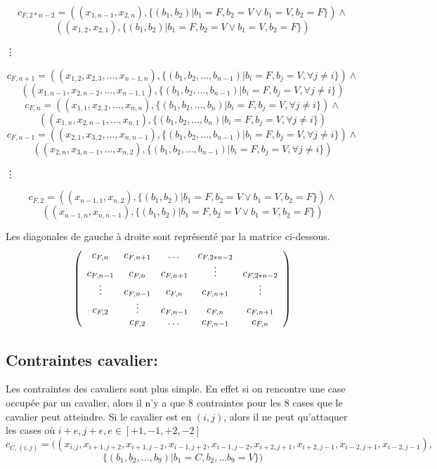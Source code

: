 \documentclass[a4paper,10pt]{article}
\begin{document}
$$ c_{F,2*n-2} = ((x_{1,n-1}, x_{2,n}), \{(b_1, b_2)| b_1 = F, b_2 = V \lor b_1 = V, b_2 = F\})\land$$ $$((x_{1,2}, x_{2,1}), \{(b_1, b_2)| b_1 = F, b_2 = V \lor b_1 = V, b_2 = F\}) $$ 
{\centering
  \vdots\par
}
$$ c_{F,n+1} = ((x_{1,2}, x_{2,3}, \ldots, x_{n-1,n}), \{(b_1, b_2, \ldots, b_{n-1})|b_i = F, b_j = V, \forall j \ne i\}) \land$$ $$((x_{1,n-1},x_{2,n-2}, \ldots, x_{n-1,1}), \{(b_1, b_2, \ldots, b_{n-1})|b_i = F, b_j = V, \forall j \ne i\}) $$
$$ c_{F,n} = ((x_{1,1}, x_{2,2},\ldots, x_{n,n}), \{(b_1, b_2, \ldots, b_n)|b_i = F, b_j = V, \forall j \ne i\}) \land$$ $$((x_{1,n}, x_{2,n-1}, \ldots, x_{n, 1}), \{(b_1, b_2, \ldots, b_n)|b_i = F, b_j = V, \forall j \ne i\})$$
$$ c_{F,n-1} = ((x_{2,1}, x_{3,2},\ldots, x_{n, n-1}), \{(b_1, b_2, \ldots, b_{n-1})|b_i = F, b_j = V, \forall j \ne i\}) \land$$ $$((x_{2,n}, x_{3,n-1}, \ldots, x_{n,2}), \{(b_1, b_2, \ldots, b_{n-1})|b_i = F, b_j = V, \forall j \ne i\}) $$
{\centering
  \vdots\par
}
$$ c_{F,2} = ((x_{n-1,1}, x_{n,2}), \{(b_1, b_2)| b_1 = F, b_2 = V \lor b_1 = V, b_2 = F\}) \land$$ $$((x_{n-1,n}, x_{n,n-1}), \{(b_1, b_2)|b_1 = F, b_2 = V \lor b_1 = V, b_2 = F\}) $$

	Les diagonales de gauche à droite sont représenté par la matrice ci-dessous.
\begin{equation}
\left( \begin{array}{ccccc}
c_{F,n} & c_{F,n+1} & \dots & c_{F,2*n-2} & \hfill \\
c_{F,n-1} & c_{F,n} & c_{F,n+1} & \vdots&  c_{F,2*n-2}\\
\vdots & c_{F,n-1} & c_{F,n} &c_{F,n+1} & \vdots \\
c_{F,2}& \vdots & c_{F,n-1}& c_{F,n} &c_{F,n+1} \\
\hfill & c_{F,2} & \dots& c_{F,n-1} & c_{F,n} \\
\end{array} \right)
\end{equation}

\subsection{Contraintes cavalier:}
	Les contraintes des cavaliers sont plus simple. En effet si on rencontre une case occupée par un cavalier, alors il n'y a que 8 contraintes pour les 8 cases que le cavalier peut atteindre.  Si le cavalier est en $(i,j)$, alors il ne peut qu'attaquer les cases où $i+e,j+e, e \in [+1,-1,+2,-2]$
$$ c_{C,(i,j)} = ((x_{i,j}, x_{i+1,j+2}, x_{i+1,j-2}, x_{i-1,j+2}, x_{i-1,j-2}, x_{i+2,j+1}, x_{i+2,j-1}, x_{i-2,j+1}, x_{i-2,j-1}),$$ $$\{(b_1, b_2, \ldots, b_9)|b_1 = C, b_2, \ldots b_9 = V\}) $$
\end{document}
